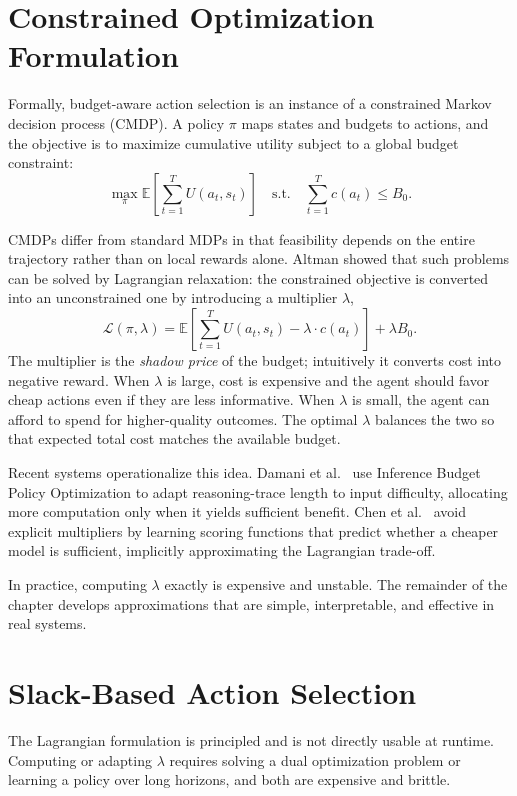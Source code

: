 \documentclass[11pt]{book}
\begin{document}
\section{Constrained Optimization Formulation}

Formally, budget-aware action selection is an instance of a constrained Markov decision process (CMDP). A policy $\pi$ maps states and budgets to actions, and the objective is to maximize cumulative utility subject to a global budget constraint:
\[
\max_\pi \mathbb{E}\left[\sum_{t=1}^{T} U(a_t, s_t)\right] \quad \text{s.t.} \quad \sum_{t=1}^{T} c(a_t) \leq B_0.
\]

CMDPs differ from standard MDPs in that feasibility depends on the entire trajectory rather than on local rewards alone. Altman \cite{altman1999constrained} showed that such problems can be solved by Lagrangian relaxation: the constrained objective is converted into an unconstrained one by introducing a multiplier $\lambda$,
\[
\mathcal{L}(\pi, \lambda) = \mathbb{E}\left[\sum_{t=1}^{T} U(a_t, s_t) - \lambda \cdot c(a_t)\right] + \lambda B_0.
\]
The multiplier is the \emph{shadow price} of the budget; intuitively it converts cost into negative reward. When $\lambda$ is large, cost is expensive and the agent should favor cheap actions even if they are less informative. When $\lambda$ is small, the agent can afford to spend for higher-quality outcomes. The optimal $\lambda$ balances the two so that expected total cost matches the available budget.

Recent systems operationalize this idea. Damani et al.\ \cite{damani2025ibpo} use Inference Budget Policy Optimization to adapt reasoning-trace length to input difficulty, allocating more computation only when it yields sufficient benefit. Chen et al.\ \cite{chen2023frugalgpt} avoid explicit multipliers by learning scoring functions that predict whether a cheaper model is sufficient, implicitly approximating the Lagrangian trade-off.

In practice, computing $\lambda$ exactly is expensive and unstable. The remainder of the chapter develops approximations that are simple, interpretable, and effective in real systems.

\section{Slack-Based Action Selection}

The Lagrangian formulation is principled and is not directly usable at runtime. Computing or adapting $\lambda$ requires solving a dual optimization problem or learning a policy over long horizons, and both are expensive and brittle.
\end{document}
